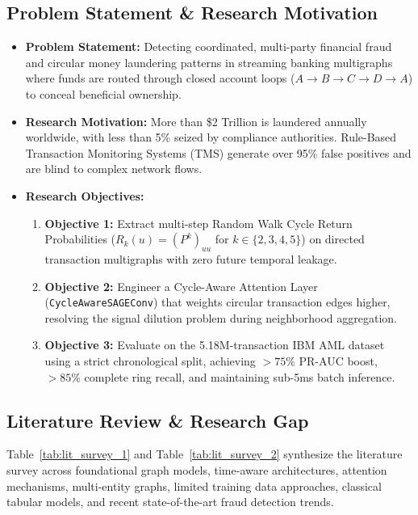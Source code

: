 \documentclass[11pt, a4paper]{article}
\begin{document}
\subsection{Problem Statement \& Research Motivation}
\begin{itemize}[noitemsep, topsep=2pt]
    \item \textbf{Problem Statement:} Detecting coordinated, multi-party financial fraud and circular money laundering patterns in streaming banking multigraphs where funds are routed through closed account loops ($A \to B \to C \to D \to A$) to conceal beneficial ownership.
    \item \textbf{Research Motivation:} More than \$2 Trillion is laundered annually worldwide, with less than 5\% seized by compliance authorities. Rule-Based Transaction Monitoring Systems (TMS) generate over 95\% false positives and are blind to complex network flows.
    \item \textbf{Research Objectives:}
    \begin{enumerate}[noitemsep, topsep=2pt]
        \item \textbf{Objective 1:} Extract multi-step Random Walk Cycle Return Probabilities ($R_k(u) = (P^k)_{uu}$ for $k \in \{2,3,4,5\}$) on directed transaction multigraphs with zero future temporal leakage.
        \item \textbf{Objective 2:} Engineer a Cycle-Aware Attention Layer (\texttt{CycleAwareSAGEConv}) that weights circular transaction edges higher, resolving the signal dilution problem during neighborhood aggregation.
        \item \textbf{Objective 3:} Evaluate on the 5.18M-transaction IBM AML dataset using a strict chronological split, achieving $>75\%$ PR-AUC boost, $>85\%$ complete ring recall, and maintaining sub-5ms batch inference.
    \end{enumerate}
\end{itemize}

\subsection{Literature Review \& Research Gap}
\noindent
Table~\ref{tab:lit_survey_1} and Table~\ref{tab:lit_survey_2} synthesize the literature survey across foundational graph models, time-aware architectures, attention mechanisms, multi-entity graphs, limited training data approaches, classical tabular models, and recent state-of-the-art fraud detection trends.
\end{document}
